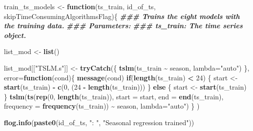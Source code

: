 \documentclass[
]{article}
\newenvironment{Shaded}{\begin{snugshade}}{\end{snugshade}}
\newcommand{\AttributeTok}[1]{\textcolor[rgb]{0.13,0.29,0.53}{#1}}
\newcommand{\ControlFlowTok}[1]{\textcolor[rgb]{0.13,0.29,0.53}{\textbf{#1}}}
\newcommand{\DecValTok}[1]{\textcolor[rgb]{0.00,0.00,0.81}{#1}}
\newcommand{\DocumentationTok}[1]{\textcolor[rgb]{0.56,0.35,0.01}{\textbf{\textit{#1}}}}
\newcommand{\FunctionTok}[1]{\textcolor[rgb]{0.13,0.29,0.53}{\textbf{#1}}}
\newcommand{\NormalTok}[1]{#1}
\newcommand{\OtherTok}[1]{\textcolor[rgb]{0.56,0.35,0.01}{#1}}
\newcommand{\SpecialCharTok}[1]{\textcolor[rgb]{0.81,0.36,0.00}{\textbf{#1}}}
\newcommand{\StringTok}[1]{\textcolor[rgb]{0.31,0.60,0.02}{#1}}
\begin{document}
\begin{Shaded}
\begin{Highlighting}[]
\NormalTok{train\_ts\_models }\OtherTok{\textless{}{-}} \ControlFlowTok{function}\NormalTok{(ts\_train, id\_of\_ts, skipTimeConsumingAlgorithmsFlag)\{}
\DocumentationTok{\#\#\# Trains the eight models with the training data.}
\DocumentationTok{\#\#\# Parameters:}
\DocumentationTok{\#\#\# ts\_train: The time series object.}
  
\NormalTok{  list\_mod }\OtherTok{\textless{}{-}} \FunctionTok{list}\NormalTok{()}
  
\NormalTok{  list\_mod[[}\StringTok{"TSLM.s"}\NormalTok{]] }\OtherTok{\textless{}{-}} \FunctionTok{tryCatch}\NormalTok{(\{}
    \FunctionTok{tslm}\NormalTok{(ts\_train }\SpecialCharTok{\textasciitilde{}}\NormalTok{ season, }\AttributeTok{lambda=}\StringTok{"auto"}\NormalTok{)}
\NormalTok{  \},}
  \AttributeTok{error=}\ControlFlowTok{function}\NormalTok{(cond)\{}
    \FunctionTok{message}\NormalTok{(cond)}
    \ControlFlowTok{if}\NormalTok{(}\FunctionTok{length}\NormalTok{(ts\_train) }\SpecialCharTok{\textless{}} \DecValTok{24}\NormalTok{) \{}
\NormalTok{      start }\OtherTok{\textless{}{-}} \FunctionTok{start}\NormalTok{(ts\_train) }\SpecialCharTok{{-}} \FunctionTok{c}\NormalTok{(}\DecValTok{0}\NormalTok{, (}\DecValTok{24} \SpecialCharTok{{-}} \FunctionTok{length}\NormalTok{(ts\_train)))}
\NormalTok{    \}}
    \ControlFlowTok{else}\NormalTok{ \{}
\NormalTok{      start }\OtherTok{\textless{}{-}} \FunctionTok{start}\NormalTok{(ts\_train)}
\NormalTok{    \}}
    \FunctionTok{tslm}\NormalTok{(}\FunctionTok{ts}\NormalTok{(}\FunctionTok{rep}\NormalTok{(}\DecValTok{0}\NormalTok{, }\FunctionTok{length}\NormalTok{(ts\_train)), }\AttributeTok{start =}\NormalTok{ start, }\AttributeTok{end =} \FunctionTok{end}\NormalTok{(ts\_train), }\AttributeTok{frequency =} \FunctionTok{frequency}\NormalTok{(ts\_train)) }\SpecialCharTok{\textasciitilde{}}\NormalTok{ season, }\AttributeTok{lambda=}\StringTok{"auto"}\NormalTok{)}
\NormalTok{  \}}
\NormalTok{  )}
  
  \FunctionTok{flog.info}\NormalTok{(}\FunctionTok{paste0}\NormalTok{(id\_of\_ts, }\StringTok{": "}\NormalTok{, }\StringTok{"Seasonal regression trained"}\NormalTok{))}
  

\end{Highlighting}
\end{Shaded}
\end{document}
